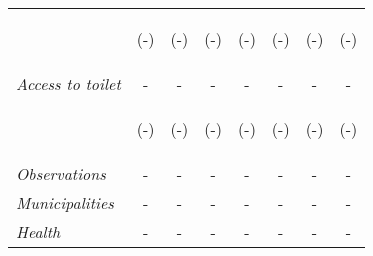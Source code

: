 \begin{tabular}{lccccccc}
\vspace{4pt} & \begin{footnotesize}(-)\end{footnotesize} &  \begin{footnotesize}(-)\end{footnotesize}  &  \begin{footnotesize}(-)\end{footnotesize}    &   \begin{footnotesize}(-)\end{footnotesize}   &   \begin{footnotesize}(-)\end{footnotesize}  &  \begin{footnotesize}(-)\end{footnotesize} &  \begin{footnotesize}(-)\end{footnotesize} \\          


\textit{Access to toilet}          		  &  -    &   -    &     -  &     -  &    -  &     - &    -    \\
\vspace{4pt} & \begin{footnotesize}(-)\end{footnotesize} &  \begin{footnotesize}(-)\end{footnotesize}  &  \begin{footnotesize}(-)\end{footnotesize}    &   \begin{footnotesize}(-)\end{footnotesize}   &   \begin{footnotesize}(-)\end{footnotesize}  &  \begin{footnotesize}(-)\end{footnotesize} &  \begin{footnotesize}(-)\end{footnotesize} \\          

\hline		
\hline		


\textit{Observations}           &   -    &    -      &  -     & -   &	 -   &	  -  &   -   	\\
\textit{Municipalities}         &   -   &    -     &  -    & -  &  -  &	  - &   -  	\\
\hline		
\hline		


\textit{Health}          		  &  -    &    -   &     -  &  -  &     -  & -  &  -    \\


\end{tabular}

